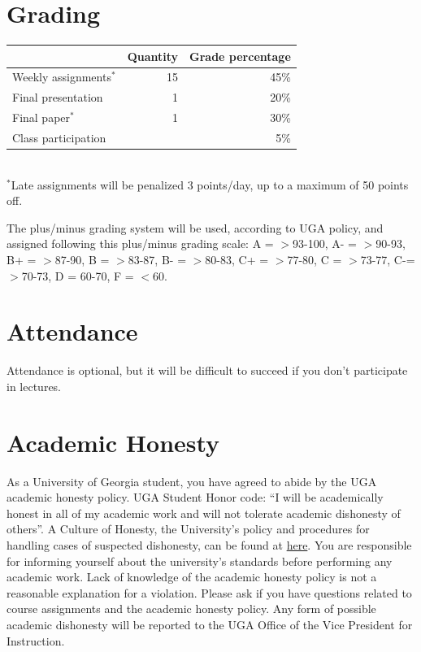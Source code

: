 \documentclass[12pt]{article}
\begin{document}
\section*{\normalsize Grading}
\vspace{-4mm}
\begin{center}
  \begin{tabular}[h!]{lrr}
    \hline
                           & Quantity & Grade percentage         \\
    \hline
    Weekly assignments$^*$ & 15       & 45\%                     \\
    Final presentation     & 1        & 20\%                     \\
    Final paper$^{*}$      & 1        & 30\%                     \\
    Class participation    &          & 5\%                      \\
    \hline
  \end{tabular}                                                  \\
  \small
\hspace{0mm} $^*$Late assignments will be penalized 3 points/day, up to a maximum of 50 points off.  \\ 
\end{center}
The plus/minus grading system will be used, according to UGA policy,
and assigned following this plus/minus grading scale: A = $>$93-100,
A- = $>$90-93, B+ = $>$87-90, B = $>$83-87, B- = $>$80-83, C+ = $>$77-80,
C = $>$73-77, C-= $>$70-73, D = 60-70, F = $<$60. 


\section*{\normalsize Attendance}
\vspace{-4mm}
Attendance is optional, but it will be difficult to succeed if you don't participate in lectures. 



\section*{\normalsize Academic Honesty}
\vspace{-4mm}
As a University of Georgia student, you have agreed to abide by the
UGA academic honesty policy. UGA Student Honor code: ``I will be
academically honest in all of my academic work and will not tolerate
academic dishonesty of others''. A Culture of Honesty, the University's
policy and procedures for handling cases of suspected dishonesty, can
be found at \href{https://honesty.uga.edu/}{here}. You are responsible for
informing yourself about the university’s standards before performing
any academic work. Lack of knowledge of the academic honesty policy is
not a reasonable explanation for a violation. Please ask if you have
questions related to course assignments and the academic honesty
policy. Any form of possible academic dishonesty will be reported to
the UGA Office of the Vice President for Instruction.
\end{document}
